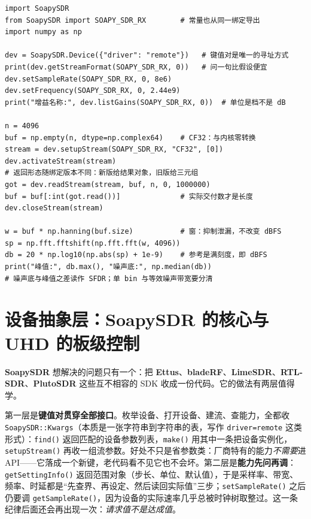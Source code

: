 \documentclass[12pt,a4paper,fontset=fandol]{ctexbook}
\newcommand{\Fn}[1]{\texttt{#1()}}
\newcommand{\Tp}[1]{\texttt{#1}}
\newcommand{\Lib}[1]{\textbf{#1}}
\begin{document}
\begin{lstlisting}[style=pythonstyle,label={lst:ch15-py},caption={Python 门面抓一段复基带并做谱：格式协商与 dBFS 口径}]
import SoapySDR
from SoapySDR import SOAPY_SDR_RX        # 常量也从同一绑定导出
import numpy as np

dev = SoapySDR.Device({"driver": "remote"})   # 键值对是唯一的寻址方式
print(dev.getStreamFormat(SOAPY_SDR_RX, 0))   # 问一句比假设便宜
dev.setSampleRate(SOAPY_SDR_RX, 0, 8e6)
dev.setFrequency(SOAPY_SDR_RX, 0, 2.44e9)
print("增益名称:", dev.listGains(SOAPY_SDR_RX, 0))  # 单位是档不是 dB

n = 4096
buf = np.empty(n, dtype=np.complex64)    # CF32：与内核零转换
stream = dev.setupStream(SOAPY_SDR_RX, "CF32", [0])
dev.activateStream(stream)
# 返回形态随绑定版本不同：新版给结果对象，旧版给三元组
got = dev.readStream(stream, buf, n, 0, 1000000)
buf = buf[:int(got.read())]              # 实际交付数才是长度
dev.closeStream(stream)

w = buf * np.hanning(buf.size)           # 窗：抑制泄漏，不改变 dBFS
sp = np.fft.fftshift(np.fft.fft(w, 4096))
db = 20 * np.log10(np.abs(sp) + 1e-9)    # 参考是满刻度，即 dBFS
print("峰值:", db.max(), "噪声底:", np.median(db))
# 噪声底与峰值之差读作 SFDR；单 bin 与等效噪声带宽要分清
\end{lstlisting}

\section{设备抽象层：\Lib{SoapySDR} 的核心与 \Lib{UHD} 的板级控制}

\Lib{SoapySDR} 想解决的问题只有一个：把 \Lib{Ettus}、\Lib{bladeRF}、\Lib{LimeSDR}、\Lib{RTL-SDR}、\Lib{PlutoSDR} 这些互不相容的 SDK 收成一份代码。它的做法有两层值得学。

第一层是\textbf{键值对贯穿全部接口}。枚举设备、打开设备、建流、查能力，全都收 \Tp{SoapySDR::Kwargs}（本质是一张字符串到字符串的表，写作 \Tp{driver=remote} 这类形式）：\Fn{find} 返回匹配的设备参数列表，\Fn{make} 用其中一条把设备实例化，\Fn{setupStream} 再收一组流参数。好处不只是省参数类：厂商特有的能力\emph{不需要}进 API——它落成一个新键，老代码看不见它也不会坏。第二层是\textbf{能力先问再调}：\Fn{getSettingInfo} 返回范围对象（步长、单位、默认值），于是采样率、带宽、频率、时延都是``先查界、再设定、然后读回实际值''三步；\Fn{setSampleRate} 之后仍要调 \Fn{getSampleRate}，因为设备的实际速率几乎总被时钟树取整过。这一条纪律后面还会再出现一次：\emph{请求值不是达成值}。
\end{document}
